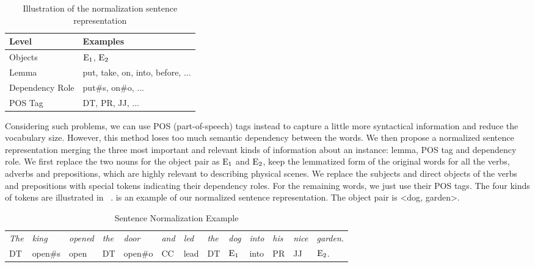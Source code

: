 \begin{table}[th!]
	\centering
\small
	\begin{tabular}{l|l}
		\hline
		\textbf{Level}	&  \textbf{Examples}\\ 		\hline
		Objects	& $\textnormal{E}_1$, $\textnormal{E}_2$ \\ 		\hline
		Lemma & put, take, on, into, before, ...\\ 		\hline 
		Dependency Role	& put\#s, on\#o, ... \\ 		\hline 
		POS Tag	& DT, PR, JJ, ... \\ 		\hline 
	\end{tabular}
	\caption{Illustration of the normalization sentence representation }
	\label{tab:norm}
\end{table}

Considering such problems, we can use POS (part-of-speech) tags instead to capture a little more syntactical information and reduce the vocabulary size. 
However, this method loses too much semantic dependency between the words. 
We then propose a normalized sentence representation merging the three most important and relevant kinds of information about an instance: lemma, POS tag and dependency role. 
We first replace the two nouns for the object pair as $\textnormal{E}_1$ and $\textnormal{E}_2$, keep the lemmatized form of the original words for all the verbs, adverbs and prepositions, which are highly relevant to describing physical scenes. 
We replace the subjects and direct objects of the verbs and prepositions with special tokens indicating their dependency roles. 
For the remaining words, we just use their POS tags. 
The four kinds of tokens are illustrated in ~.
 is an example of our normalized sentence representation. The object pair is \textless dog, garden\textgreater.

\begin{table*}[!th]
\centering
\begin{tabular}{lllllllllllll}
		\hline
\textit{The }&\textit{king }&\textit{opened }&\textit{the}&\textit{door}&\textit{and}& \textit{led}& \textit{the}& \textit{dog }& \textit{into }& \textit{his }& \textit{nice }& \textit{garden.}\\		 
DT & open\#s & open & DT & open\#o & CC& lead& DT &$\textnormal{E}_1$ & into & PR & JJ& $\textnormal{E}_2$.\\	 \hline
\end{tabular}
\caption{Sentence Normalization Example}
\label{tab:norm_eg}
\end{table*}

